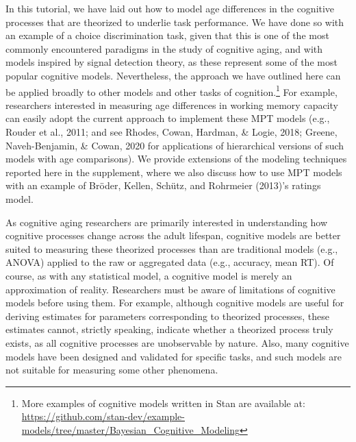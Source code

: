 \documentclass[
  english,
  ,man,floatsintext]{apa6}
\begin{document}
In this tutorial, we have laid out how to model age differences in the cognitive processes that are theorized to underlie task performance. We have done so with an example of a choice discrimination task, given that this is one of the most commonly encountered paradigms in the study of cognitive aging, and with models inspired by signal detection theory, as these represent some of the most popular cognitive models. Nevertheless, the approach we have outlined here can be applied broadly to other models and other tasks of cognition.\footnote{More examples of cognitive models written in Stan are available at: \url{https://github.com/stan-dev/example-models/tree/master/Bayesian_Cognitive_Modeling}} For example, researchers interested in measuring age differences in working memory capacity can easily adopt the current approach to implement these MPT models (e.g., Rouder et al., 2011; and see Rhodes, Cowan, Hardman, \& Logie, 2018; Greene, Naveh-Benjamin, \& Cowan, 2020 for applications of hierarchical versions of such models with age comparisons). We provide extensions of the modeling techniques reported here in the supplement, where we also discuss how to use MPT models with an example of Bröder, Kellen, Schütz, and Rohrmeier (2013)'s ratings model.

As cognitive aging researchers are primarily interested in understanding how cognitive processes change across the adult lifespan, cognitive models are better suited to measuring these theorized processes than are traditional models (e.g., ANOVA) applied to the raw or aggregated data (e.g., accuracy, mean RT). Of course, as with any statistical model, a cognitive model is merely an approximation of reality. Researchers must be aware of limitations of cognitive models before using them. For example, although cognitive models are useful for deriving estimates for parameters corresponding to theorized processes, these estimates cannot, strictly speaking, indicate whether a theorized process truly exists, as all cognitive processes are unobservable by nature. Also, many cognitive models have been designed and validated for specific tasks, and such models are not suitable for measuring some other phenomena.
\end{document}
